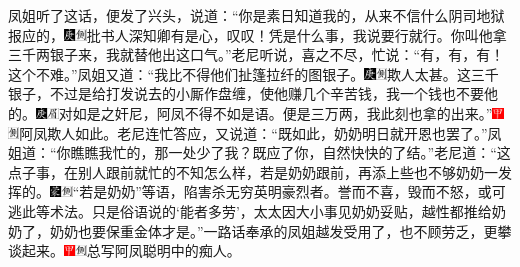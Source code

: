 凤姐听了这话，便发了兴头，说道：``你是素日知道我的，从来不信什么阴司地狱报应的，{\includegraphics[width=3mm]{../Images/00004}\includegraphics[width=3mm]{../Images/00011}\footnotesize \kaishu 批书人深知卿有是心，叹叹！}凭是什么事，我说要行就行。你叫他拿三千两银子来，我就替他出这口气。''老尼听说，喜之不尽，忙说：``有，有，有！这个不难。''凤姐又道：``我比不得他们扯篷拉纤的图银子。{\includegraphics[width=3mm]{../Images/00004}\includegraphics[width=3mm]{../Images/00011}\footnotesize \kaishu 欺人太甚。}这三千银子，不过是给打发说去的小厮作盘缠，使他赚几个辛苦钱，我一个钱也不要他的。{\includegraphics[width=3mm]{../Images/00004}\includegraphics[width=3mm]{../Images/00010}\footnotesize \kaishu 对如是之奸尼，阿凤不得不如是语。}便是三万两，我此刻也拿的出来。''{\includegraphics[width=3mm]{../Images/00002}\includegraphics[width=3mm]{../Images/00011}\footnotesize \kaishu 阿凤欺人如此。}老尼连忙答应，又说道：``既如此，奶奶明日就开恩也罢了。''凤姐道：``你瞧瞧我忙的，那一处少了我？既应了你，自然快快的了结。''老尼道：``这点子事，在别人跟前就忙的不知怎么样，若是奶奶跟前，再添上些也不够奶奶一发挥的。{\includegraphics[width=3mm]{../Images/00006}\includegraphics[width=3mm]{../Images/00011}\footnotesize \kaishu ``若是奶奶''等语，陷害杀无穷英明豪烈者。誉而不喜，毁而不怒，或可逃此等术法。}只是俗语说的`能者多劳'，太太因大小事见奶奶妥贴，越性都推给奶奶了，奶奶也要保重金体才是。''一路话奉承的凤姐越发受用了，也不顾劳乏，更攀谈起来。{\includegraphics[width=3mm]{../Images/00002}\includegraphics[width=3mm]{../Images/00011}\footnotesize \kaishu 总写阿凤聪明中的痴人。}

